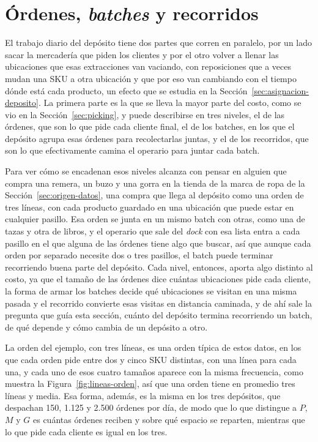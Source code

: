 \section{Órdenes, \emph{batches} y recorridos}
\label{sec:ordenes-batches}

El trabajo diario del depósito tiene dos partes que corren en paralelo, por un lado sacar la mercadería que piden los clientes y por el otro volver a llenar las ubicaciones que esas extracciones van vaciando, con reposiciones que a veces mudan una SKU a otra ubicación y que por eso van cambiando con el tiempo dónde está cada producto, un efecto que se estudia en la Sección~\ref{sec:asignacion-deposito}.
La primera parte es la que se lleva la mayor parte del costo, como se vio en la Sección~\ref{sec:picking}, y puede describirse en tres niveles, el de las órdenes, que son lo que pide cada cliente final, el de los batches, en los que el depósito agrupa esas órdenes para recolectarlas juntas, y el de los recorridos, que son lo que efectivamente camina el operario para juntar cada batch.

Para ver cómo se encadenan esos niveles alcanza con pensar en alguien que compra una remera, un buzo y una gorra en la tienda de la marca de ropa de la Sección~\ref{sec:origen-datos}, una compra que llega al depósito como una orden de tres líneas, con cada producto guardado en una ubicación que puede estar en cualquier pasillo.
Esa orden se junta en un mismo batch con otras, como una de tazas y otra de libros, y el operario que sale del \emph{dock} con esa lista entra a cada pasillo en el que alguna de las órdenes tiene algo que buscar, así que aunque cada orden por separado necesite dos o tres pasillos, el batch puede terminar recorriendo buena parte del depósito.
Cada nivel, entonces, aporta algo distinto al costo, ya que el tamaño de las órdenes dice cuántas ubicaciones pide cada cliente, la forma de armar los batches decide qué ubicaciones se visitan en una misma pasada y el recorrido convierte esas visitas en distancia caminada, y de ahí sale la pregunta que guía esta sección, cuánto del depósito termina recorriendo un batch, de qué depende y cómo cambia de un depósito a otro.

La orden del ejemplo, con tres líneas, es una orden típica de estos datos, en los que cada orden pide entre dos y cinco SKU distintas, con una línea para cada una, y cada uno de esos cuatro tamaños aparece con la misma frecuencia, como muestra la Figura~\ref{fig:lineas-orden}, así que una orden tiene en promedio tres líneas y media.
Esa forma, además, es la misma en los tres depósitos, que despachan 150, 1.125 y 2.500 órdenes por día, de modo que lo que distingue a $P$, $M$ y $G$ es cuántas órdenes reciben y sobre qué espacio se reparten, mientras que lo que pide cada cliente es igual en los tres.

